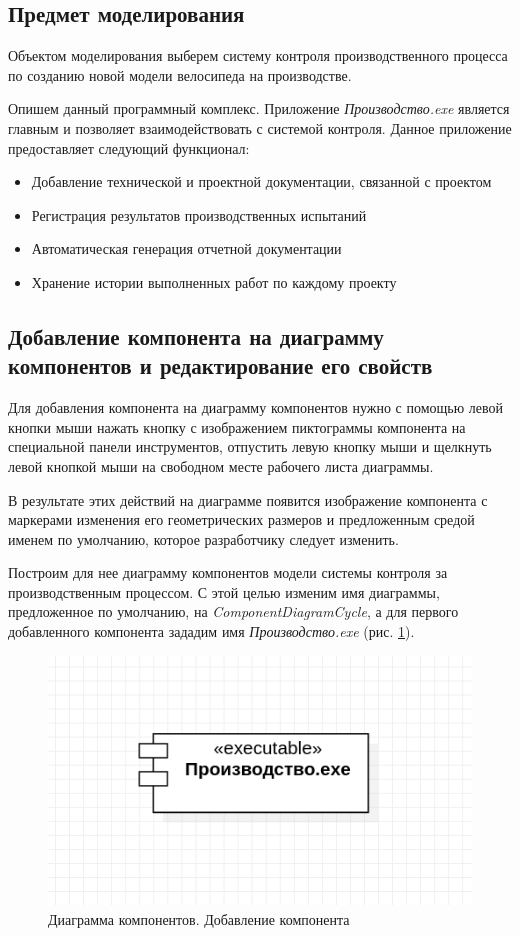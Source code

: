 \documentclass[a4paper,12pt]{report}
\begin{document}
\subsection*{Предмет моделирования}
Объектом моделирования выберем систему контроля производственного процесса по созданию новой модели велосипеда на производстве. 

Опишем данный программный комплекс. Приложение \textit{Производство.exe} является главным и позволяет взаимодействовать с системой контроля. Данное приложение предоставляет следующий функционал:
\begin{itemize}
	\item Добавление технической и проектной документации, связанной с проектом
	\item Регистрация результатов производственных испытаний
	\item Автоматическая генерация отчетной документации
	\item Хранение истории выполненных работ по каждому проекту
\end{itemize}

\subsection*{Добавление компонента на диаграмму компонентов и редактирование его свойств}
Для добавления компонента на диаграмму компонентов нужно с помощью левой кнопки мыши нажать кнопку с изображением пиктограммы компонента на специальной панели инструментов, отпустить левую кнопку мыши и щелкнуть левой кнопкой мыши на свободном месте рабочего листа диаграммы. 

В результате этих действий на диаграмме появится изображение компонента с маркерами изменения его геометрических размеров и предложенным средой именем по умолчанию, которое разработчику следует изменить. 

Построим для нее диаграмму компонентов модели системы контроля за производственным процессом. С этой целью изменим имя диаграммы, предложенное по умолчанию, на \textit{ComponentDiagramCycle}, а для первого добавленного компонента зададим имя \textit{Производство.exe} (рис. \ref{fig:componentsmain}).

\begin{figure}[h!]
	\centering
	\includegraphics[width=0.5\linewidth]{images/componentsmain}
	\caption{Диаграмма компонентов. Добавление компонента}
	\label{fig:componentsmain}
\end{figure}
\end{document}
